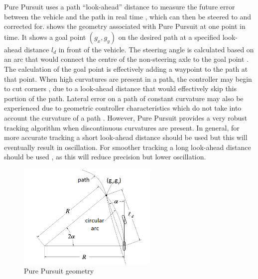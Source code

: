 \documentclass[main.tex]{subfiles}
\begin{document}
Pure Pursuit uses a path ``look-ahead'' distance to measure the future error between the vehicle and the path in real time \parencite{Lundgren2003}, which can then be steered to and corrected for.  shows the geometry associated with Pure Pursuit at one point in time. It shows a goal point $(g_x, g_y)$ on the desired path at a specified look-ahead distance $l_d$ in front of the vehicle. The steering angle is calculated based on an arc that would connect the centre of the non-steering axle to the goal point \parencite{Samuel2016}. The calculation of the goal point is effectively adding a waypoint to the path at that point. When high curvatures are present in a path, the controller may begin to cut corners \parencite{Lundgren2003}, due to a look-ahead distance that would effectively skip this portion of the path. Lateral error on a path of constant curvature may also be experienced due to geometric controller characteristics which do not take into account the curvature of a path \parencite{snider2009}. However, Pure Pursuit provides a very robust tracking algorithm when discontinuous curvatures are present. In general, for more accurate tracking a short look-ahead distance should be used \parencite{Giesbrecht2005} but this will eventually result in oscillation. For smoother tracking a long look-ahead distance should be used \parencite{Samuel2016}, as this will reduce precision but lower oscillation.
\begin{figure}[ht]
\includegraphics[width=0.6\textwidth]{2-LiteratureReview/purePursuitGoal.png}
\centering
\caption[Pure Pursuit geometry]{Pure Pursuit geometry \parencite{snider2009}} 
\end{figure}

\end{document}
